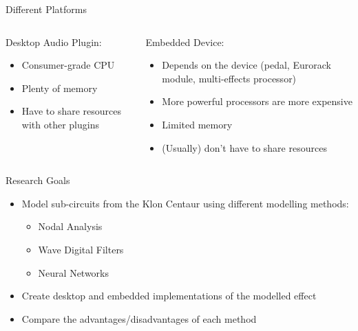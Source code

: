 \begin{frame}{Different Platforms}
    \begin{columns}
        \begin{column}{0.5\linewidth}
            \hspace{-1ex}
            Desktop Audio Plugin:
            \vspace{1ex}
            \begin{itemize}
                \itemsep0.5em
                \item Consumer-grade CPU
                \item Plenty of memory
                \item Have to share resources with other plugins
            \end{itemize}
        \end{column}
        \begin{column}{0.5\linewidth}
            \hspace{-1ex}
            Embedded Device:
            \vspace{1ex}
            \begin{itemize}
                \itemsep0.5em
                \item Depends on the device (pedal, Eurorack module, multi-effects processor)
                \item More powerful processors are more expensive
                \item Limited memory
                \item (Usually) don't have to share resources
            \end{itemize}
        \end{column}
    \end{columns}
\end{frame}

\begin{frame}{Research Goals}
    \begin{itemize}
        \item Model sub-circuits from the Klon Centaur using different modelling methods:
        \begin{itemize}
            \itemsep0em
            \item Nodal Analysis
            \item Wave Digital Filters
            \item Neural Networks
        \end{itemize}
        \item Create desktop and embedded implementations of the modelled effect
        \item Compare the advantages/disadvantages of each method
    \end{itemize}
\end{frame}


